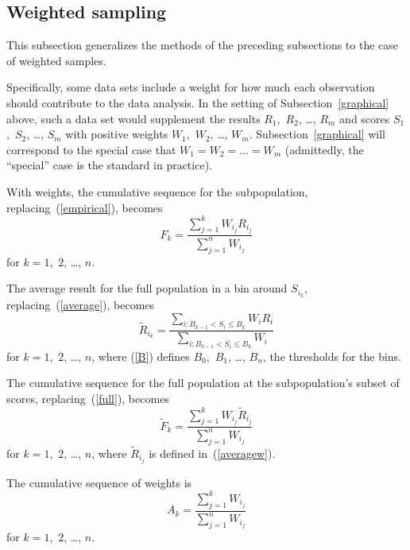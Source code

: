 \documentclass{article}
\begin{document}
\subsection{Weighted sampling}
\label{weighted}

This subsection generalizes the methods of the preceding subsections
to the case of weighted samples.

Specifically, some data sets include a weight for how much each observation
should contribute to the data analysis. In the setting
of Subsection~\ref{graphical} above,
such a data set would supplement the results $R_1$,~$R_2$, \dots, $R_m$
and scores $S_1$,~$S_2$, \dots, $S_m$ with positive weights
$W_1$,~$W_2$, \dots, $W_m$.
Subsection~\ref{graphical} will correspond to the special case that
$W_1 = W_2 = \dots = W_m$ (admittedly, the ``special'' case is the standard
in practice).

With weights, the cumulative sequence for the subpopulation,
replacing~(\ref{empirical}), becomes
%
\begin{equation}
\label{empiricalw}
F_k = \frac{\sum_{j=1}^k W_{i_j} R_{i_j}}{\sum_{j=1}^n W_{i_j}}
\end{equation}
%
for $k = 1$,~$2$, \dots, $n$.

The average result for the full population in a bin around $S_{i_k}$,
replacing~(\ref{average}), becomes
%
\begin{equation}
\label{averagew}
\tilde{R}_{i_k} = \frac{\sum_{i : B_{k-1} < S_i \le B_k} W_i R_i}
                       {\sum_{i : B_{k-1} < S_i \le B_k} W_i}
\end{equation}
%
for $k = 1$,~$2$, \dots, $n$, where (\ref{B})
defines $B_0$,~$B_1$, \dots, $B_n$, the thresholds for the bins.

The cumulative sequence for the full population at the subpopulation's subset
of scores, replacing~(\ref{full}), becomes
%
\begin{equation}
\label{fullw}
\tilde{F}_k
= \frac{\sum_{j=1}^k W_{i_j} \tilde{R}_{i_j}}{\sum_{j=1}^n W_{i_j}}
\end{equation}
%
for $k = 1$,~$2$, \dots, $n$,
where $\tilde{R}_{i_j}$ is defined in~(\ref{averagew}).

The cumulative sequence of weights is
%
\begin{equation}
\label{abscissae}
A_k = \frac{\sum_{j=1}^k W_{i_j}}{\sum_{j=1}^n W_{i_j}}
\end{equation}
%
for $k = 1$,~$2$, \dots, $n$.
\end{document}
